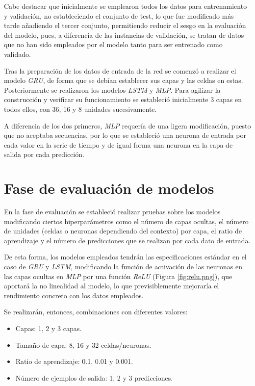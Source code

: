 
Cabe destacar que inicialmente se emplearon todos los datos para entrenamiento y validación, no estableciendo
el conjunto de test, lo que fue modificado más tarde añadiendo el tercer conjunto, permitiendo reducir el sesgo en 
la evaluación del modelo, pues, a diferencia de las instancias de validación, se tratan
de datos que no han sido empleados por el modelo tanto para ser entrenado como validado.

Tras la preparación de los datos de entrada de la red se comenzó a realizar el modelo \textit{GRU}, de forma
que se debían establecer sus capas y las celdas en estas. Posteriormente se realizaron los modelos
\textit{LSTM} y \textit{MLP}.
Para agilizar la construcción y verificar su funcionamiento se estableció inicialmente 3 capas en todos ellos, con
36, 16 y 8 unidades sucesivamente.

A diferencia de los dos primeros, \textit{MLP} requería de una ligera modificación, puesto que no aceptaba secuencias, 
por lo que se estableció una neurona de entrada por cada valor en la serie de tiempo y de igual forma una 
neurona en la capa de salida por cada predicción. 

\section{Fase de evaluación de modelos}
En la fase de evaluación se estableció realizar pruebas sobre los modelos modificando ciertos hiperparámetros como 
el número de capas ocultas, el número de unidades (celdas o neuronas dependiendo del contexto) por capa, el
ratio de aprendizaje y el número de predicciones que se realizan por cada dato de entrada.

De esta forma, los modelos empleados tendrán las especificaciones estándar en el caso de
\textit{GRU} y \textit{LSTM}, modificando la función de activación de las neuronas en las capas ocultas en 
\textit{MLP} por una función \textit{ReLU} (Figura \ref{fig:relu.png}), que aportará la no linealidad al modelo, lo que previsiblemente
mejoraría el rendimiento concreto con los datos empleados.


Se realizarán, entonces, combinaciones con diferentes valores:
\begin{itemize}
    \item Capas: 1, 2 y 3 capas.
    \item Tamaño de capa: 8, 16 y 32 celdas/neuronas.
    \item Ratio de aprendizaje: 0.1, 0.01 y 0.001.
    \item Número de ejemplos de salida: 1, 2 y 3 predicciones.
\end{itemize}

